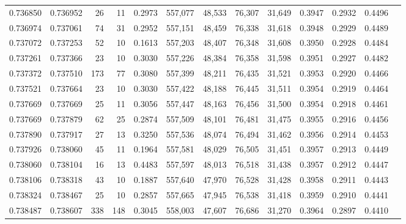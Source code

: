 \begin{tabular}{rrrrrrrrrrrrr}
0.736850 & 0.736952 &    26 &  11 &                                     0.2973 & 557,077 &  48,533 &  76,307 &  31,649 & 0.3947 & 0.2932 & 0.4496 \\
0.736974 & 0.737061 &    74 &  31 &                                     0.2952 & 557,151 &  48,459 &  76,338 &  31,618 & 0.3948 & 0.2929 & 0.4489 \\
0.737072 & 0.737253 &    52 &  10 &                                     0.1613 & 557,203 &  48,407 &  76,348 &  31,608 & 0.3950 & 0.2928 & 0.4484 \\
0.737261 & 0.737366 &    23 &  10 &                                     0.3030 & 557,226 &  48,384 &  76,358 &  31,598 & 0.3951 & 0.2927 & 0.4482 \\
0.737372 & 0.737510 &   173 &  77 &                                     0.3080 & 557,399 &  48,211 &  76,435 &  31,521 & 0.3953 & 0.2920 & 0.4466 \\
0.737521 & 0.737664 &    23 &  10 &                                     0.3030 & 557,422 &  48,188 &  76,445 &  31,511 & 0.3954 & 0.2919 & 0.4464 \\
0.737669 & 0.737669 &    25 &  11 &                                     0.3056 & 557,447 &  48,163 &  76,456 &  31,500 & 0.3954 & 0.2918 & 0.4461 \\
0.737669 & 0.737879 &    62 &  25 &                                     0.2874 & 557,509 &  48,101 &  76,481 &  31,475 & 0.3955 & 0.2916 & 0.4456 \\
0.737890 & 0.737917 &    27 &  13 &                                     0.3250 & 557,536 &  48,074 &  76,494 &  31,462 & 0.3956 & 0.2914 & 0.4453 \\
0.737926 & 0.738060 &    45 &  11 &                                     0.1964 & 557,581 &  48,029 &  76,505 &  31,451 & 0.3957 & 0.2913 & 0.4449 \\
0.738060 & 0.738104 &    16 &  13 &                                     0.4483 & 557,597 &  48,013 &  76,518 &  31,438 & 0.3957 & 0.2912 & 0.4447 \\
0.738106 & 0.738318 &    43 &  10 &                                     0.1887 & 557,640 &  47,970 &  76,528 &  31,428 & 0.3958 & 0.2911 & 0.4443 \\
0.738324 & 0.738467 &    25 &  10 &                                     0.2857 & 557,665 &  47,945 &  76,538 &  31,418 & 0.3959 & 0.2910 & 0.4441 \\
0.738487 & 0.738607 &   338 & 148 &                                     0.3045 & 558,003 &  47,607 &  76,686 &  31,270 & 0.3964 & 0.2897 & 0.4410 \\

\end{tabular}
